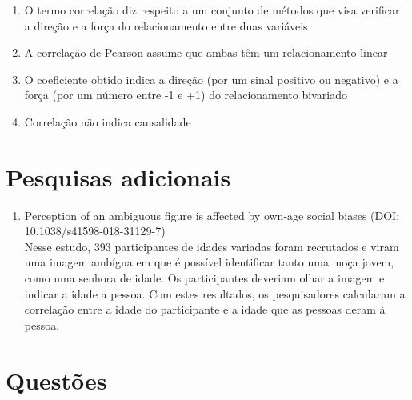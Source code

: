 \documentclass[
]{book}
\providecommand{\tightlist}{%
  \setlength{\itemsep}{0pt}\setlength{\parskip}{0pt}}
\begin{document}
\begin{enumerate}
\def\labelenumi{\arabic{enumi}.}
\tightlist
\item
  O termo correlação diz respeito a um conjunto de métodos que visa verificar a direção e a força do relacionamento entre duas variáveis\\
\item
  A correlação de Pearson assume que ambas têm um relacionamento linear\\
\item
  O coeficiente obtido indica a direção (por um sinal positivo ou negativo) e a força (por um número entre -1 e +1) do relacionamento bivariado\\
\item
  Correlação não indica causalidade\\
\end{enumerate}

\hypertarget{pesquisas-adicionais-7}{%
\section{Pesquisas adicionais}\label{pesquisas-adicionais-7}}

\begin{enumerate}
\def\labelenumi{\arabic{enumi}.}
\tightlist
\item
  Perception of an ambiguous figure is affected by own-age social biases (DOI: 10.1038/s41598-018-31129-7)\\
  Nesse estudo, 393 participantes de idades variadas foram recrutados e viram uma imagem ambígua em que é possível identificar tanto uma moça jovem, como uma senhora de idade. Os participantes deveriam olhar a imagem e indicar a idade a pessoa. Com estes resultados, os pesquisadores calcularam a correlação entre a idade do participante e a idade que as pessoas deram à pessoa.
\end{enumerate}

\hypertarget{questuxf5es-7}{%
\section{Questões}\label{questuxf5es-7}}
\end{document}
